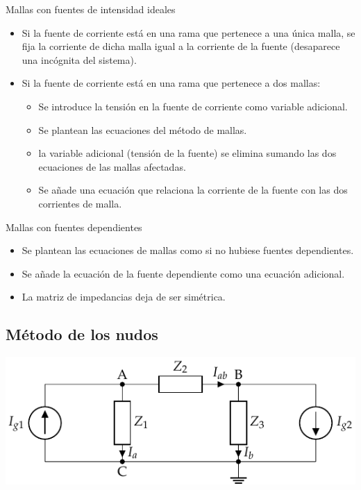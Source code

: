\documentclass[aspectratio=169, usenames,svgnames,dvipsnames]{beamer}
\begin{document}
\begin{frame}[label={sec:org58c3c2f}]{Mallas con fuentes de intensidad ideales}
\begin{itemize}
\item Si la fuente de corriente está en una rama que pertenece a una única malla, se fija la corriente de dicha malla igual a la corriente de la fuente (desaparece una incógnita del sistema).
\item Si la fuente de corriente está en una rama que pertenece a dos mallas:
\begin{itemize}
\item Se introduce la tensión en la fuente de corriente como variable adicional.
\item Se plantean las ecuaciones del método de mallas.
\item la variable adicional (tensión de la fuente) se elimina sumando las dos ecuaciones de las mallas afectadas.
\item Se añade una ecuación que relaciona la corriente de la fuente con las dos corrientes de malla.
\end{itemize}
\end{itemize}
\end{frame}
\begin{frame}[label={sec:org4370d22}]{Mallas con fuentes dependientes}
\begin{itemize}
\item Se plantean las ecuaciones de mallas como si no hubiese fuentes dependientes.
\item Se añade la ecuación de la fuente dependiente como una ecuación adicional.
\item La matriz de impedancias deja de ser simétrica.
\end{itemize}
\end{frame}

\subsection{Método de los nudos}
\label{sec:orgd8e20ff}
\begin{frame}[label={sec:org21d20a0}]{}
\begin{center}
\includegraphics[width=.9\linewidth]{../figs/nudosAC.pdf}
\end{center}
\end{frame}
\end{document}
